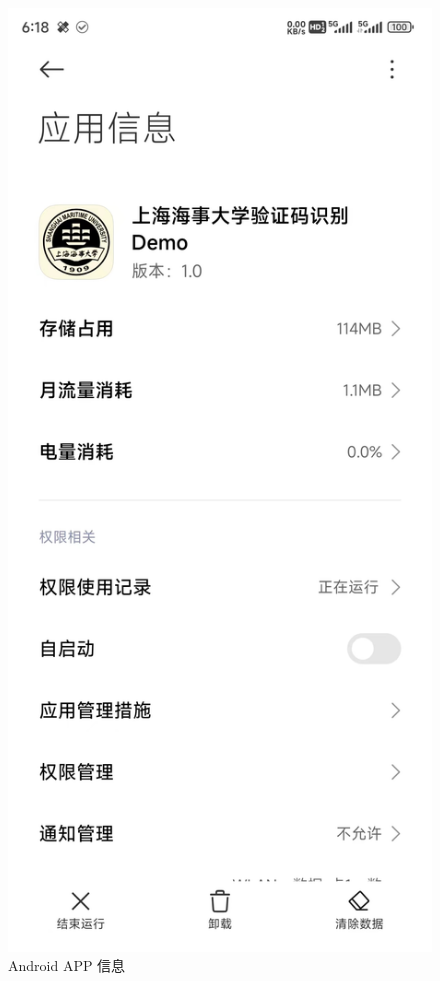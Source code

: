 \begin{figure}
	\centering
	\includegraphics[width=0.6\linewidth]{Resources/Picture/Deploy/Android/app_info}
	\caption{Android APP 信息}
	\label{fig:appinfo}
\end{figure}


